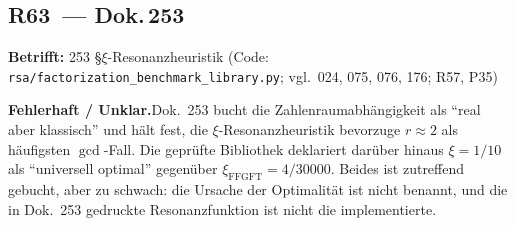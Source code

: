 \medskip


\subsection*{R63~--- Dok.\,253}

\noindent\textbf{Betrifft:} 253 \S{}$\xi$-Resonanzheuristik (Code: \texttt{rsa/\allowbreak factorization\_\allowbreak benchmark\_\allowbreak library.py}; vgl.\ 024, 075, 076, 176; R57, P35)


\smallskip\noindent\textbf{Fehlerhaft / Unklar.}\quad Dok.~253 bucht die Zahlenraumabhängigkeit als \enquote{real aber klassisch}
  und hält fest, die $\xi$-Resonanzheuristik bevorzuge $r \approx 2$ als
  häufigsten $\gcd$-Fall. Die geprüfte Bibliothek deklariert darüber hinaus
  $\xi = 1/10$ als \enquote{universell optimal} gegenüber
  $\xi_\text{FFGFT} = 4/30000$. Beides ist zutreffend gebucht, aber zu
  schwach: die Ursache der Optimalität ist nicht benannt, und die in
  Dok.~253 gedruckte Resonanzfunktion ist nicht die implementierte.


